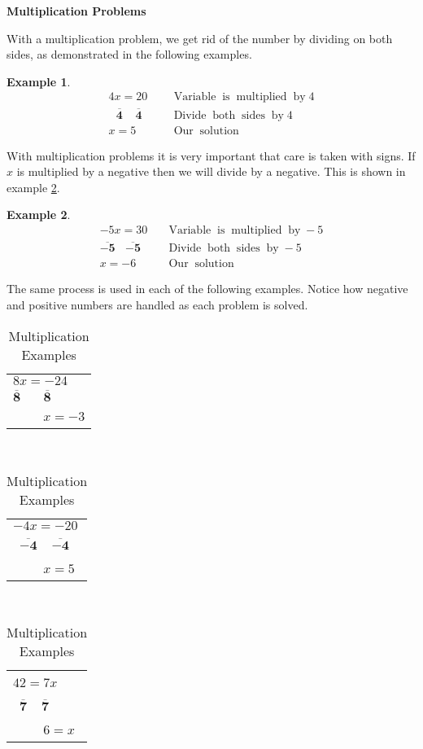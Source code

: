 \documentclass[12pt]{book}
\theoremstyle{definition}
\newtheorem{example}{Example}
\newcommand{\tmmathbf}[1]{\ensuremath{\boldsymbol{#1}}}
\newcommand{\tmop}[1]{\ensuremath{\operatorname{#1}}}
\begin{document}
\par
{\bf Multiplication Problems}\par
With a multiplication problem, we get rid of the number by dividing on both sides, as demonstrated in the following examples.
\begin{example}\label{Lin8}
  \begin{eqnarray*}
    4 x = 20 ~~&  & \tmop{Variable} \tmop{is} \tmop{multiplied} \tmop{by} 4\\
    ~~~\tmmathbf{\overline{4} ~~~~~ \overline{4}}~~ &  & \tmop{Divide} \tmop{both}
    \tmop{sides} \tmop{by} 4\\
    x = 5~~ &  & \tmop{Our} \tmop{solution}
  \end{eqnarray*}
\end{example}
With multiplication problems it is very important that care is taken with signs. If $x$ is multiplied by a negative then we will divide by a negative. This is shown in example \ref{Lin9}.
\begin{example}\label{Lin9}
  \begin{eqnarray*}
    - 5 x = 30 &  & \tmop{Variable} \tmop{is} \tmop{multiplied} \tmop{by} -
    5\\
    \tmmathbf{\overline{- 5} ~~~~ \overline{- 5}} &  & \tmop{Divide} \tmop{both}
    \tmop{sides} \tmop{by} - 5\\
    x = - 6 &  & \tmop{Our} \tmop{solution}
  \end{eqnarray*}
\end{example}
The same process is used in each of the following examples. Notice how negative and positive numbers are handled as each problem is solved.
 \begin{table}[h]
    \begin{tabular}{l}
      $8 x = - 24$\\
      $\tmmathbf{\overline{8} ~~~~~~~~ \overline{8}}$\\
      ~~~~ $x = - 3$
    \end{tabular} \ \ \ \ \ \ \ \ \ \ \ \ \ \ \ \ \ \ \ \begin{tabular}{l}
      $- 4 x = - 20$\\
      \ $\tmmathbf{\overline{- 4} ~~~~~ \overline{- 4}}$\\
      ~~~~ $x = 5$
    \end{tabular} \ \ \ \ \ \ \ \ \ \ \ \ \ \ \ \ \ \ \ \begin{tabular}{l}
      $42 = 7 x$~~\\
      ~$\tmmathbf{\overline{7} ~~~~~ \overline{7}}$\\
      ~~~~ $6 = x$
    \end{tabular}
    \caption{Multiplication Examples}
  \end{table}
\end{document}
